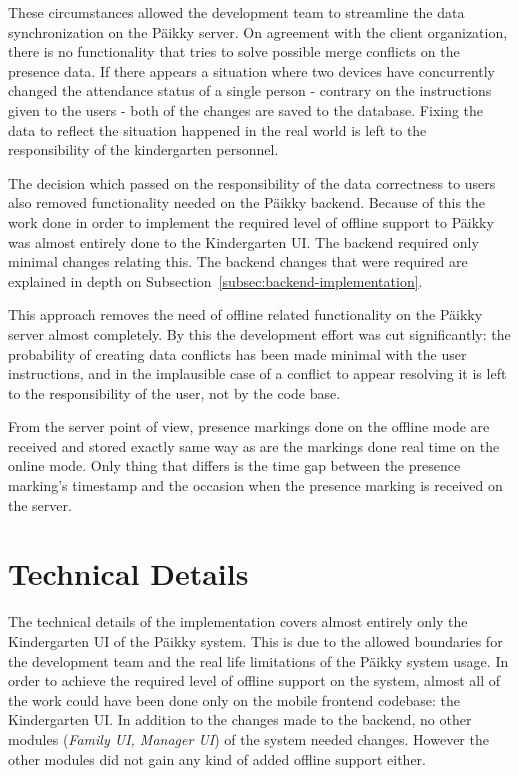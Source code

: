 These circumstances allowed the development team to streamline the data synchronization on the Päikky server. On agreement with the client organization, there is no functionality that tries to solve possible merge conflicts on the presence data. If there appears a situation where two devices have concurrently changed the attendance status of a single person - contrary on the instructions given to the users - both of the changes are saved to the database. Fixing the data to reflect the situation happened in the real world is left to the responsibility of the kindergarten personnel.

The decision which passed on the responsibility of the data correctness to users also removed functionality needed on the Päikky backend. Because of this the work done in order to implement the required level of offline support to Päikky was almost entirely done to the Kindergarten UI. The backend required only minimal changes relating this. The backend changes that were required are explained in depth on Subsection~\ref{subsec:backend-implementation}. 

This approach removes the need of offline related functionality on the Päikky server almost completely. By this the development effort was cut significantly: the probability of creating data conflicts has been made minimal with the user instructions, and in the implausible case of a conflict to appear resolving it is left to the responsibility of the user, not by the code base. 

From the server point of view, presence markings done on the offline mode are received and stored exactly same way as are the markings done real time on the online mode. Only thing that differs is the time gap between the presence marking's timestamp and the occasion when the presence marking is received on the server. 





\section{Technical Details}
The technical details of the implementation covers almost entirely only the Kindergarten UI of the Päikky system. This is due to the allowed boundaries for the development team and the real life limitations of the Päikky system usage. In order to achieve the required level of offline support on the system, almost all of the work could have been done only on the mobile frontend codebase: the Kindergarten UI. In addition to the changes made to the backend, no other modules (\textit{Family UI, Manager UI}) of the system needed changes. However the other modules did not gain any kind of added offline support either.


